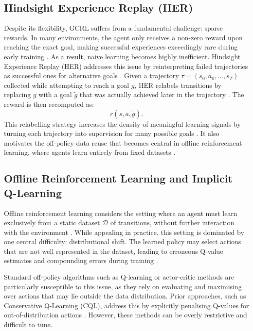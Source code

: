 \subsection{Hindsight Experience Replay (HER)}

Despite its flexibility, GCRL suffers from a fundamental challenge: sparse rewards. In many environments, the agent only receives a non-zero reward upon reaching the exact goal, making successful experiences exceedingly rare during early training \cite{her,plappert2018multigoalreinforcementlearningchallenging}. As a result, naive learning becomes highly inefficient.
Hindsight Experience Replay (HER) addresses this issue by reinterpreting failed trajectories as successful ones for alternative goals \cite{her}. Given a trajectory $\tau = (s_0, a_0, \dots, s_T)$ collected while attempting to reach a goal $g$, HER relabels transitions by replacing $g$ with a goal $\tilde{g}$ that was actually achieved later in the trajectory \cite{her}. The reward is then recomputed as:
\begin{equation}
    r(s, a, \tilde{g}).
\end{equation}
This relabelling strategy increases the density of meaningful learning signals by turning each trajectory into supervision for many possible goals \cite{her,nair2018visualreinforcementlearningimagined}. It also motivates the off-policy data reuse that becomes central in offline reinforcement learning, where agents learn entirely from fixed datasets \cite{levine2020offlinereinforcementlearningtutorial}.

\subsection{Offline Reinforcement Learning and Implicit Q-Learning}
\label{sec:iql}
Offline reinforcement learning considers the setting where an agent must learn exclusively from a static dataset $\mathcal{D}$ of transitions, without further interaction with the environment \cite{levine2020offlinereinforcementlearningtutorial}. While appealing in practice, this setting is dominated by one central difficulty: distributional shift. The learned policy may select actions that are not well represented in the dataset, leading to erroneous Q-value estimates and compounding errors during training \cite{fujimoto2019offpolicydeepreinforcementlearning, kumar2019stabilizingoffpolicyqlearningbootstrapping}.

Standard off-policy algorithms such as Q-learning or actor-critic methods are particularly susceptible to this issue, as they rely on evaluating and maximising over actions that may lie outside the data distribution. Prior approaches, such as Conservative Q-Learning (CQL), address this by explicitly penalising Q-values for out-of-distribution actions \cite{kumar2019stabilizingoffpolicyqlearningbootstrapping, kumar2020conservativeqlearningofflinereinforcement}. However, these methods can be overly restrictive and difficult to tune.

